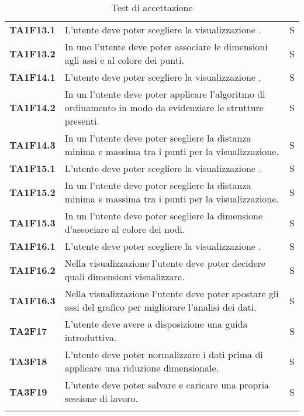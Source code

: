 {\begin{longtable}{ C{2cm} | C{12cm}| C{1.5cm} }
\textbf{TA1F13.1} & 
L'utente deve poter scegliere la visualizzazione . & 
S\\

\textbf{TA1F13.2} & 
In uno  l'utente deve poter associare le dimensioni agli assi e al colore dei punti. & 
S\\

\textbf{TA1F14.1} & 
L'utente deve poter scegliere la visualizzazione . & 
S\\

\textbf{TA1F14.2} & 
In un  l'utente deve poter applicare l'algoritmo di ordinamento in modo da evidenziare le strutture presenti. & 
S\\

\textbf{TA1F14.3} & 
In un  l'utente deve poter scegliere la distanza minima e massima tra i punti per la visualizzazione. & 
S\\

\textbf{TA1F15.1} & 
L'utente deve poter scegliere la visualizzazione . & 
S\\

\textbf{TA1F15.2} & 
In un  l'utente deve poter scegliere la distanza minima e massima tra i punti per la visualizzazione. & 
S\\

\textbf{TA1F15.3} & 
In un  l'utente deve poter scegliere la dimensione d'associare al colore dei nodi. & 
S\\

\textbf{TA1F16.1} & 
L'utente deve poter scegliere la visualizzazione . & 
S\\

\textbf{TA1F16.2} & 
Nella visualizzazione  l'utente deve poter decidere quali dimensioni visualizzare. & 
S\\

\textbf{TA1F16.3} & 
Nella visualizzazione  l'utente deve poter spostare gli assi del grafico per migliorare l'analisi dei dati. & 
S\\

\textbf{TA2F17} & 
L'utente deve avere a disposizione una guida introduttiva. & 
S\\

\textbf{TA3F18} & 
L'utente deve poter normalizzare i dati prima di applicare una riduzione dimensionale. & 
S\\

\textbf{TA3F19} & 
L'utente deve poter salvare e caricare una propria sessione di lavoro. & 
S\\

\caption{Test di accettazione}
\label{testSistema}
\end{longtable}

}